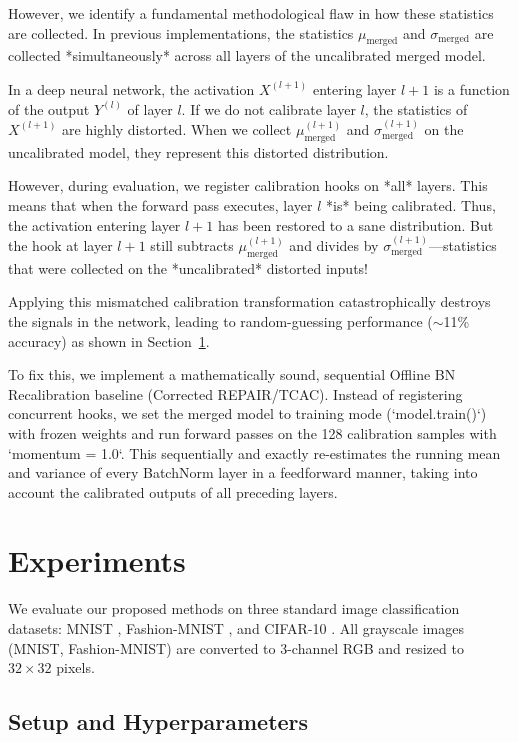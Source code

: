 \documentclass{article}
\theoremstyle{plain}
\theoremstyle{definition}
\theoremstyle{remark}
\begin{document}
However, we identify a fundamental methodological flaw in how these statistics are collected. In previous implementations, the statistics $\mu_{\text{merged}}$ and $\sigma_{\text{merged}}$ are collected *simultaneously* across all layers of the uncalibrated merged model. 

In a deep neural network, the activation $X^{(l+1)}$ entering layer $l+1$ is a function of the output $Y^{(l)}$ of layer $l$. If we do not calibrate layer $l$, the statistics of $X^{(l+1)}$ are highly distorted. When we collect $\mu_{\text{merged}}^{(l+1)}$ and $\sigma_{\text{merged}}^{(l+1)}$ on the uncalibrated model, they represent this distorted distribution. 

However, during evaluation, we register calibration hooks on *all* layers. This means that when the forward pass executes, layer $l$ *is* being calibrated. Thus, the activation entering layer $l+1$ has been restored to a sane distribution. But the hook at layer $l+1$ still subtracts $\mu_{\text{merged}}^{(l+1)}$ and divides by $\sigma_{\text{merged}}^{(l+1)}$—statistics that were collected on the *uncalibrated* distorted inputs! 

Applying this mismatched calibration transformation catastrophically destroys the signals in the network, leading to random-guessing performance ($\sim$11\% accuracy) as shown in Section~\ref{exper}.

To fix this, we implement a mathematically sound, sequential Offline BN Recalibration baseline (Corrected REPAIR/TCAC). Instead of registering concurrent hooks, we set the merged model to training mode (`model.train()`) with frozen weights and run forward passes on the 128 calibration samples with `momentum = 1.0`. This sequentially and exactly re-estimates the running mean and variance of every BatchNorm layer in a feedforward manner, taking into account the calibrated outputs of all preceding layers. 

\section{Experiments}
\label{exper}

We evaluate our proposed methods on three standard image classification datasets: MNIST \cite{lecun1998mnist}, Fashion-MNIST \cite{xiao2017fashion}, and CIFAR-10 \cite{krizhevsky2009cifar}. All grayscale images (MNIST, Fashion-MNIST) are converted to 3-channel RGB and resized to $32 \times 32$ pixels.

\subsection{Setup and Hyperparameters}
\end{document}
